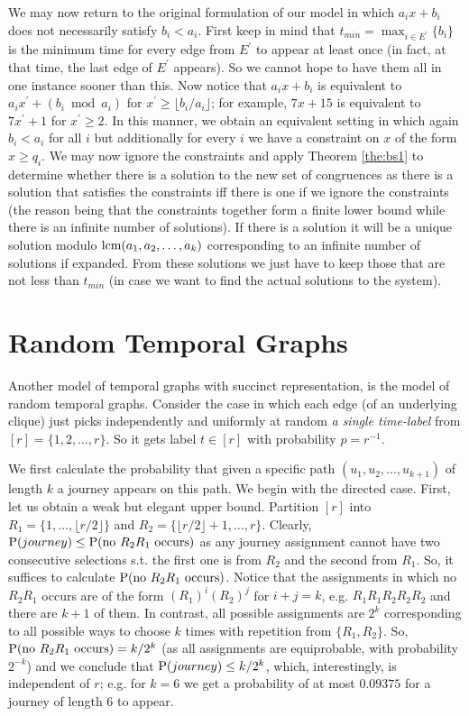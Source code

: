 \documentclass[oribibl, 11pt]{llncs}
\DeclareMathOperator{\lcm}{\textup{lcm}}
\renewcommand{\P}{\textup{P}}
\begin{document}
We may now return to the original formulation of our model in which $a_ix+b_i$ does not necessarily satisfy $b_i<a_i$. First keep in mind that $t_{min}=\max_{i\in E^\prime}\{b_i\}$ is the minimum time for every edge from $E^\prime$ to appear at least once (in fact, at that time, the last edge of $E^\prime$ appears). So we cannot hope to have them all in one instance sooner than this. Now notice that $a_ix+b_i$ is equivalent to $a_ix^\prime+(b_i\bmod a_i)$ for $x^\prime\geq \lfloor b_i/a_i\rfloor$; for example, $7x+15$ is equivalent to $7x^\prime+1$ for $x^\prime\geq 2$. In this manner, we obtain an equivalent setting in which again $b_i<a_i$ for all $i$ but additionally for every $i$ we have a constraint on $x$ of the form $x\geq q_i$. We may now ignore the constraints and apply Theorem \ref{the:bs1} to determine whether there is a solution to the new set of congruences as there is a solution that satisfies the constraints iff there is one if we ignore the constraints (the reason being that the constraints together form a finite lower bound while there is an infinite number of solutions). If there is a solution it will be a unique solution modulo $\lcm(a_1,a_2,\ldots,a_k)$ corresponding to an infinite number of solutions if expanded. From these solutions we just have to keep those that are not less than $t_{min}$ (in case we want to find the actual solutions to the system). 

\section{Random Temporal Graphs}
\label{sec:random}

Another model of temporal graphs with succinct representation, is the model of random temporal graphs. Consider the case in which each edge (of an underlying clique) just picks independently and uniformly at random \emph{a single time-label} from $[r]=\{1,2,\ldots,r\}$. So it gets label $t\in[r]$ with probability $p=r^{-1}$.

We first calculate the probability that given a specific path $(u_1,u_2,\ldots,u_{k+1})$ of length $k$ a journey appears on this path. We begin with the directed case. First, let us obtain a weak but elegant upper bound. Partition $[r]$ into $R_1=\{1,\ldots,\lfloor r/2\rfloor\}$ and $R_2=\{\lfloor r/2\rfloor+1,\ldots,r\}$. Clearly, $\P(journey)\leq \P(\text{no } R_2R_1 \text{ occurs})$ as any journey assignment cannot have two consecutive selections s.t. the first one is from $R_2$ and the second from $R_1$. So, it suffices to calculate $\P(\text{no } R_2R_1 \text{ occurs})$. Notice that the assignments in which no $R_2R_1$ occurs are of the form $(R_1)^{i}(R_2)^{j}$ for $i+j=k$, e.g. $R_1R_1R_2R_2R_2$ and there are $k+1$ of them. In contrast, all possible assignments are $2^k$ corresponding to all possible ways to choose $k$ times with repetition from $\{R_1,R_2\}$. So, $\P(\text{no } R_2R_1 \text{ occurs})=k/2^k$ (as all assignments are equiprobable, with probability $2^{-k}$) and we conclude that $\P(journey)\leq k/2^k$, which, interestingly, is independent of $r$; e.g. for $k=6$ we get a probability of at most $0.09375$ for a journey of length $6$ to appear.
\end{document}
